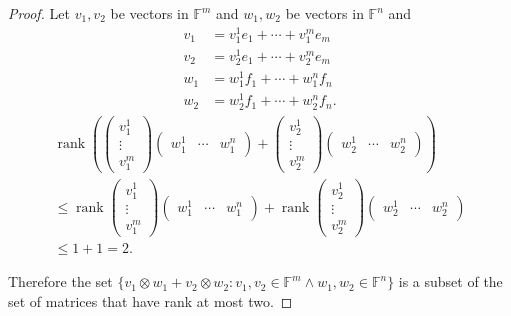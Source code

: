 \begin{proof}
    Let $v_{1}, v_{2}$ be vectors in $\mathbb{F}^{m}$ and $w_{1}, w_{2}$ be vectors in $\mathbb{F}^{n}$ and
    \begin{align*}
        v_{1} & = v_{1}^{1}e_{1} + \cdots + v_{1}^{m}e_{m}  \\
        v_{2} & = v_{2}^{1}e_{1} + \cdots + v_{2}^{m}e_{m}  \\
        w_{1} & = w_{1}^{1}f_{1} + \cdots + w_{1}^{n}f_{n}  \\
        w_{2} & = w_{2}^{1}f_{1} + \cdots + w_{2}^{n}f_{n}.
    \end{align*}
    \begin{multline*}
        \operatorname{rank}\left(\begin{pmatrix}v_{1}^{1} \\ \vdots \\ v_{1}^{m}\end{pmatrix}\begin{pmatrix}w_{1}^{1} & \cdots & w_{1}^{n}\end{pmatrix} + \begin{pmatrix}v_{2}^{1} \\ \vdots \\ v_{2}^{m}\end{pmatrix}\begin{pmatrix}w_{2}^{1} & \cdots & w_{2}^{n}\end{pmatrix}\right) \\
        \leq \operatorname{rank}\begin{pmatrix}v_{1}^{1} \\ \vdots \\ v_{1}^{m}\end{pmatrix}\begin{pmatrix}w_{1}^{1} & \cdots & w_{1}^{n}\end{pmatrix} + \operatorname{rank}\begin{pmatrix}v_{2}^{1} \\ \vdots \\ v_{2}^{m}\end{pmatrix}\begin{pmatrix}w_{2}^{1} & \cdots & w_{2}^{n}\end{pmatrix} \\
        \leq 1 + 1 = 2.
    \end{multline*}

    Therefore the set $\{ v_{1}\otimes w_{1} + v_{2}\otimes w_{2}: v_{1}, v_{2}\in \mathbb{F}^{m}\land w_{1}, w_{2}\in \mathbb{F}^{n} \}$ is a subset of the set of matrices that have rank at most two.


\end{proof}
